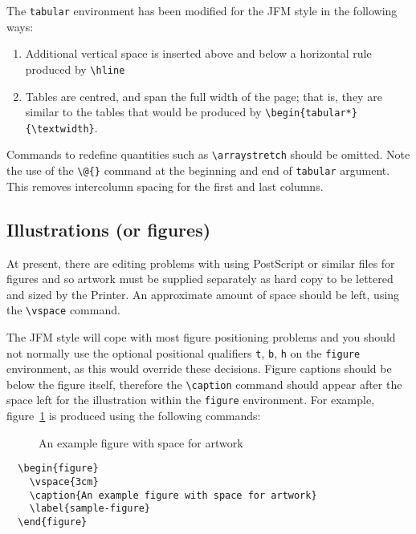 \documentclass{jfm}
\begin{document}
The \verb"tabular" environment has been modified for the JFM style in the
following ways:
\begin{enumerate}
  \item Additional vertical space is inserted above and below a horizontal
        rule produced by \verb"\hline"
  \item Tables are centred, and span the full width of the page; that is,
        they are similar to the tables that would be produced by
        \verb"\begin{tabular*}{\textwidth}".
\end{enumerate}
Commands to redefine quantities such as \verb"\arraystretch" should be
omitted. Note the use of the \verb"\@{}" command at the beginning and end of
\verb"tabular" argument. This removes intercolumn spacing for
the first and last columns.

\subsection{Illustrations (or figures)}

At present, there are editing problems with using PostScript or similar
files for figures and so artwork must be supplied separately as hard copy
to be lettered and sized by the Printer. An approximate amount of space
should be left, using the \verb"\vspace" command.

The JFM style will cope with most figure positioning problems and you should
not normally use the optional positional qualifiers \verb"t", \verb"b",
\verb"h" on the \verb"figure" environment, as this would override these
decisions. Figure captions should be below the figure itself, therefore the
\verb"\caption" command should appear after the space left for the
illustration within the \verb"figure" environment.
For example, figure~\ref{sample-figure} is produced using the following
commands:
\begin{figure}
  \vspace{3cm}
  \caption{An example figure with space for artwork}
  \label{sample-figure}
\end{figure}

\begin{verbatim}
  \begin{figure}
    \vspace{3cm}
    \caption{An example figure with space for artwork}
    \label{sample-figure}
  \end{figure}
\end{verbatim}
\end{document}
